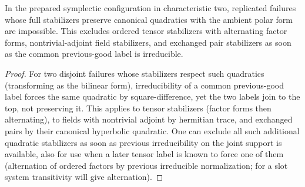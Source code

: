 \begin{lemma}
\label{fb:canonical-quadratic-exclusion}
In the prepared symplectic configuration in characteristic two, replicated
failures whose full stabilizers preserve canonical quadratics with the ambient
polar form are impossible.  This excludes ordered tensor stabilizers with
alternating factor forms, nontrivial-adjoint field stabilizers, and exchanged
pair stabilizers as soon as the common previous-good label is irreducible.
\end{lemma}
\begin{proof}

For two disjoint failures whose stabilizers respect such quadratics (transforming as the bilinear form), irreducibility of a common previous-good label forces the same quadratic by square-difference, yet the two labels join to the top, not preserving it. This applies to tensor stabilizers (factor forms then alternating), to fields with nontrivial adjoint by hermitian trace, and exchanged pairs by their canonical hyperbolic quadratic. One can exclude all such additional quadratic stabilizers as soon as previous irreducibility on the joint support is available, also for use when a later tensor label is known to force one of them (alternation of ordered factors by previous irreducible normalization; for a slot system transitivity will give alternation).

\end{proof}

